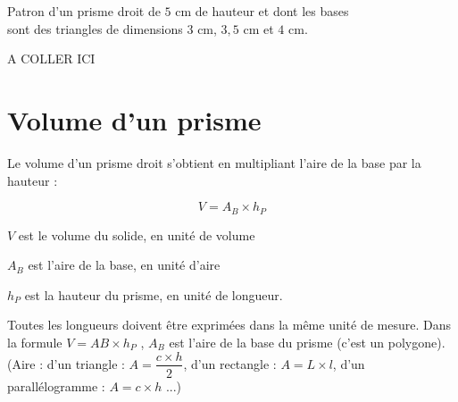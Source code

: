 \documentclass[a4paper,10pt]{report}
\begin{document}
\begin{ex}
Patron d'un prisme droit de $5$ cm de hauteur et dont les bases \\sont des triangles de dimensions $3$ cm, $3,5$ cm et $4$ cm.

\vspace{-6mm}
\begin{flushright}
A COLLER ICI \hspace{2.5cm}\textcolor{white}{.}
\end{flushright}
\end{ex}

\vspace{-3mm}
\section{Volume d'un prisme}

\vspace{-2mm}
\begin{prop}
Le volume d'un prisme droit s'obtient en multipliant l'aire de la base par la hauteur :

\medskip
\noindent \begin{minipage}{6cm}
$$V = A_B \times h_P$$
\end{minipage}
\begin{minipage}{10cm}
$V$ est le volume du solide, en unité de volume

$A_B$ est l'aire de la base, en unité d'aire

$h_P$ est la hauteur du prisme, en unité de longueur.
\end{minipage}
\end{prop}

\begin{rem}
Toutes les longueurs doivent être exprimées dans la même unité de mesure.
Dans la formule $V = AB \times h_P$ , $A_B$ est l'aire de la base du prisme (c'est un polygone).
(Aire : d'un triangle : $A = \dfrac{c \times h}{2}$, d'un rectangle : $A = L \times l$, d'un parallélogramme : $A = c \times h$ ...)
\end{rem}
\end{document}
